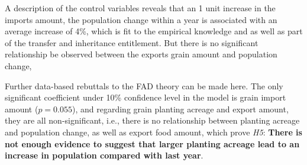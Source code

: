 A description of the control variables reveals that an 1 unit increase in the imports amount, the population change within a year is associated with an average increase of 4\%, which is fit to the empirical knowledge and as well as part of the transfer and inheritance entitlement. But there is no significant relationship be observed between the exports grain amount and population change,

Further data-based rebuttals to the FAD theory can be made here. The only significant coefficient under 10\% confidence level in the model is grain import amount ($p=0.055$), and regarding grain planting acreage and export amount, they are all non-significant, i.e., there is no relationship between planting acreage and population change, as well as export food amount, which prove \textit{H5}: \textbf{There is not enough evidence to suggest that larger planting acreage lead to an increase in population compared with last year}. 


